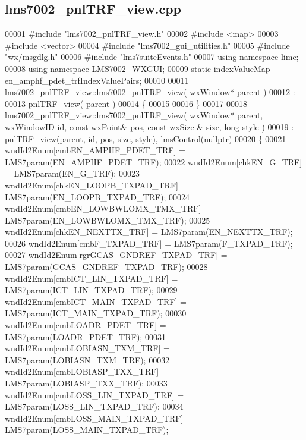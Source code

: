 \subsection{lms7002\+\_\+pnl\+T\+R\+F\+\_\+view.\+cpp}
\label{lms7002__pnlTRF__view_8cpp_source}

\begin{DoxyCode}
00001 \textcolor{preprocessor}{#include "lms7002_pnlTRF_view.h"}
00002 \textcolor{preprocessor}{#include <map>}
00003 \textcolor{preprocessor}{#include <vector>}
00004 \textcolor{preprocessor}{#include "lms7002_gui_utilities.h"}
00005 \textcolor{preprocessor}{#include "wx/msgdlg.h"}
00006 \textcolor{preprocessor}{#include "lms7suiteEvents.h"}
00007 \textcolor{keyword}{using namespace }lime;
00008 \textcolor{keyword}{using namespace }LMS7002_WXGUI;
00009 \textcolor{keyword}{static} indexValueMap en_amphf_pdet_trfIndexValuePairs;
00010 
00011 lms7002_pnlTRF_view::lms7002_pnlTRF_view( wxWindow* parent )
00012 :
00013 pnlTRF_view( parent )
00014 \{
00015 
00016 \}
00017 
00018 lms7002_pnlTRF_view::lms7002_pnlTRF_view( wxWindow* parent, wxWindowID \textcolor{keywordtype}{id}, \textcolor{keyword}{const} wxPoint& pos, \textcolor{keyword}{const} wxSize
      & size, \textcolor{keywordtype}{long} style )
00019     : pnlTRF_view(parent, id, pos, size, style), lmsControl(nullptr)
00020 \{
00021     wndId2Enum[cmbEN_AMPHF_PDET_TRF] = LMS7param(EN_AMPHF_PDET_TRF);
00022     wndId2Enum[chkEN_G_TRF] = LMS7param(EN_G_TRF);
00023     wndId2Enum[chkEN_LOOPB_TXPAD_TRF] = LMS7param(EN_LOOPB_TXPAD_TRF);
00024     wndId2Enum[cmbEN_LOWBWLOMX_TMX_TRF] = LMS7param(EN_LOWBWLOMX_TMX_TRF);
00025     wndId2Enum[chkEN_NEXTTX_TRF] = LMS7param(EN_NEXTTX_TRF);
00026     wndId2Enum[cmbF_TXPAD_TRF] = LMS7param(F_TXPAD_TRF);
00027     wndId2Enum[rgrGCAS_GNDREF_TXPAD_TRF] = LMS7param(GCAS_GNDREF_TXPAD_TRF);
00028     wndId2Enum[cmbICT_LIN_TXPAD_TRF] = LMS7param(ICT_LIN_TXPAD_TRF);
00029     wndId2Enum[cmbICT_MAIN_TXPAD_TRF] = LMS7param(ICT_MAIN_TXPAD_TRF);
00030     wndId2Enum[cmbLOADR_PDET_TRF] = LMS7param(LOADR_PDET_TRF);
00031     wndId2Enum[cmbLOBIASN_TXM_TRF] = LMS7param(LOBIASN_TXM_TRF);
00032     wndId2Enum[cmbLOBIASP_TXX_TRF] = LMS7param(LOBIASP_TXX_TRF);
00033     wndId2Enum[cmbLOSS_LIN_TXPAD_TRF] = LMS7param(LOSS_LIN_TXPAD_TRF);
00034     wndId2Enum[cmbLOSS_MAIN_TXPAD_TRF] = LMS7param(LOSS_MAIN_TXPAD_TRF);

\end{DoxyCode}
